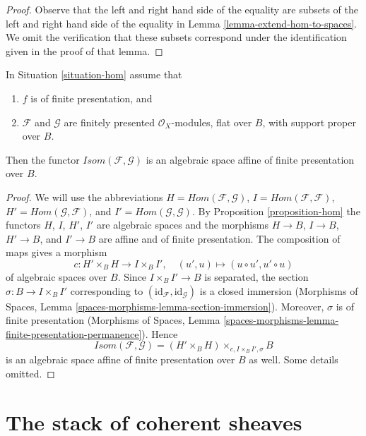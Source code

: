 \begin{proof}
Observe that the left and right hand side of the equality are
subsets of the left and right hand side of the equality in
Lemma \ref{lemma-extend-hom-to-spaces}.
We omit the verification that these subsets correspond under
the identification given in the proof of that lemma.
\end{proof}

\begin{proposition}
\label{proposition-isom}
In Situation \ref{situation-hom} assume that
\begin{enumerate}
\item $f$ is of finite presentation, and
\item $\mathcal{F}$ and $\mathcal{G}$ are finitely presented
$\mathcal{O}_X$-modules, flat over $B$, with support proper over $B$.
\end{enumerate}
Then the functor $\mathit{Isom}(\mathcal{F}, \mathcal{G})$ is
an algebraic space affine of finite presentation over $B$.
\end{proposition}

\begin{proof}
We will use the abbreviations
$H = \mathit{Hom}(\mathcal{F}, \mathcal{G})$,
$I = \mathit{Hom}(\mathcal{F}, \mathcal{F})$,
$H' = \mathit{Hom}(\mathcal{G}, \mathcal{F})$, and
$I' = \mathit{Hom}(\mathcal{G}, \mathcal{G})$.
By Proposition \ref{proposition-hom} the functors
$H$, $I$, $H'$, $I'$ are algebraic spaces and the morphisms
$H \to B$, $I \to B$, $H' \to B$, and $I' \to B$
are affine and of finite presentation.
The composition of maps gives a morphism
$$
c : H' \times_B H \longrightarrow I \times_B I',\quad
(u', u) \longmapsto (u \circ u', u' \circ u)
$$
of algebraic spaces over $B$. Since $I \times_B I' \to B$ is separated,
the section $\sigma : B \to I \times_B I'$ corresponding to
$(\text{id}_\mathcal{F}, \text{id}_\mathcal{G})$
is a closed immersion
(Morphisms of Spaces, Lemma \ref{spaces-morphisms-lemma-section-immersion}).
Moreover, $\sigma$ is of finite presentation
(Morphisms of Spaces, Lemma
\ref{spaces-morphisms-lemma-finite-presentation-permanence}).
Hence
$$
\mathit{Isom}(\mathcal{F}, \mathcal{G}) =
(H' \times_B H) \times_{c, I \times_B I', \sigma} B
$$
is an algebraic space affine of finite presentation over $B$ as well.
Some details omitted.
\end{proof}






\section{The stack of coherent sheaves}
\label{section-stack-coherent-sheaves}

